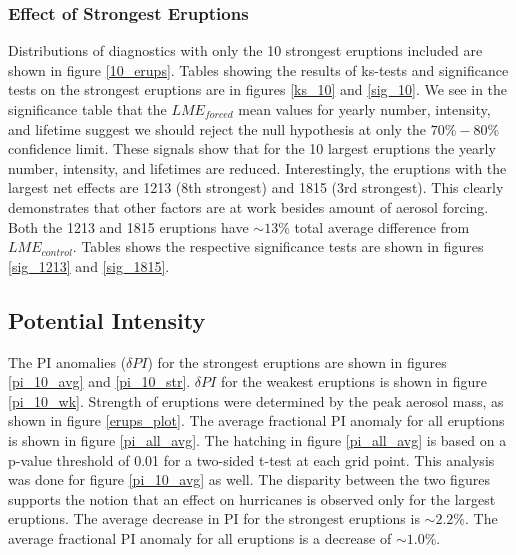 \documentclass[smallextended]{svjour3}       %
\begin{document}
\subsubsection{Effect of Strongest Eruptions}
Distributions of diagnostics with only the 10 strongest eruptions
included are shown in figure \ref{10_erups}. Tables showing the
results of ks-tests and significance tests on the strongest eruptions
are in figures \ref{ks_10} and \ref{sig_10}. We see in the
significance table that the $LME_{forced}$ mean values for yearly
number, intensity, and lifetime suggest we should reject the null
hypothesis at only the $70\%-80\%$ confidence limit. These signals
show that for the 10 largest eruptions the yearly number, intensity,
and lifetimes are reduced. Interestingly, the eruptions with the
largest net effects are 1213 (8th strongest) and 1815 (3rd
strongest). This clearly demonstrates that other factors are at work
besides amount of aerosol forcing. Both the 1213 and 1815 eruptions
have ${\sim}13\%$ total average difference from
$LME_{control}$. Tables shows the respective significance tests are
shown in figures \ref{sig_1213} and \ref{sig_1815}.

\subsection{Potential Intensity}
The PI anomalies ($\delta PI$) for the strongest eruptions are shown in figures \ref{pi_10_avg} and \ref{pi_10_str}. $\delta PI$ for the weakest eruptions is shown in figure \ref{pi_10_wk}. Strength of eruptions were determined by the peak aerosol mass, as shown in figure \ref{erups_plot}. The average fractional PI anomaly for all eruptions is shown in figure \ref{pi_all_avg}. The hatching in figure \ref{pi_all_avg} is based on a p-value threshold of 0.01 for a two-sided t-test at each grid point. This analysis was done for figure \ref{pi_10_avg} as well. The disparity between the two figures supports the notion that an effect on hurricanes is observed only for the largest eruptions. The average decrease in PI for the strongest eruptions is ${\sim}2.2\%$. The average fractional PI anomaly for all eruptions is a decrease of ${\sim}1.0\%$.   
\end{document}
